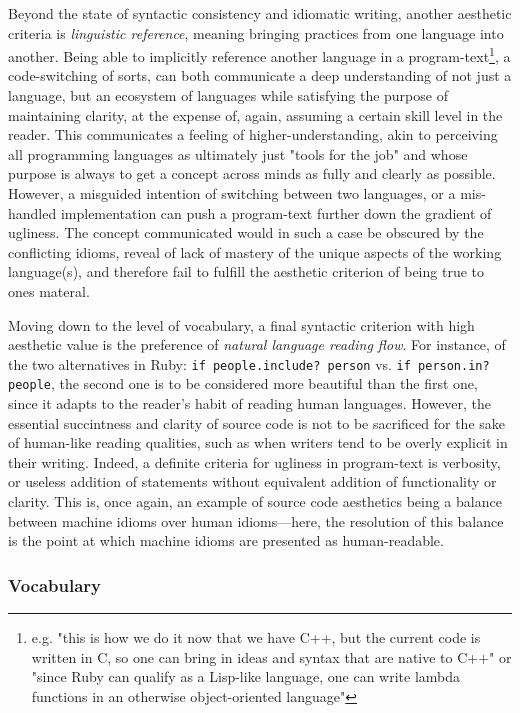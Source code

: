 Beyond the state of syntactic consistency and idiomatic writing, another aesthetic criteria is \emph{linguistic reference}, meaning bringing practices from one language into another. Being able to implicitly reference another language in a program-text\footnote{e.g. "this is how we do it now that we have C++, but the current code is written in C, so one can bring in ideas and syntax that are native to C++" or "since Ruby can qualify as a Lisp-like language, one can write lambda functions in an otherwise object-oriented language"}, a code-switching of sorts, can both communicate a deep understanding of not just a language, but an ecosystem of languages while satisfying the purpose of maintaining clarity, at the expense of, again, assuming a certain skill level in the reader. This communicates a feeling of higher-understanding, akin to perceiving all programming languages as ultimately just "tools for the job" and whose purpose is always to get a concept across minds as fully and clearly as possible. However, a misguided intention of switching between two languages, or a mis-handled implementation can push a program-text further down the gradient of ugliness. The concept communicated would in such a case be obscured by the conflicting idioms, reveal of lack of mastery of the unique aspects of the working language(s), and therefore fail to fulfill the aesthetic criterion of being true to ones materal.

Moving down to the level of vocabulary, a final syntactic criterion with high aesthetic value is the preference of \emph{natural language reading flow}. For instance, of the two alternatives in Ruby: \lstinline{if people.include? person} vs. \lstinline{if person.in? people}, the second one is to be considered more beautiful than the first one, since it adapts to the reader's habit of reading human languages. However, the essential succintness and clarity of source code is not to be sacrificed for the sake of human-like reading qualities, such as when writers tend to be overly explicit in their writing. Indeed, a definite criteria for ugliness in program-text is verbosity, or useless addition of statements without equivalent addition of functionality or clarity. This is, once again, an example of source code aesthetics being a balance between machine idioms over human idioms—here, the resolution of this balance is the point at which machine idioms are presented as human-readable.

\subsubsection{Vocabulary}
\label{subsubsec:framework-vocabulary}

